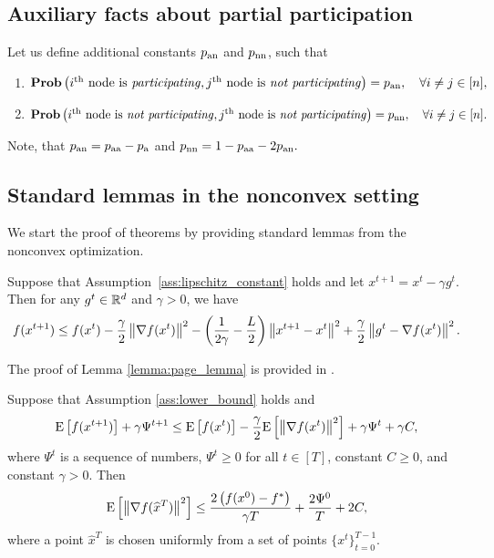 \documentclass{article}
\newcommand*{\probavailable}{\ensuremath{p_{\textnormal{a}}}}
\newcommand*{\probpairaa}{\ensuremath{p_{\textnormal{aa}}}}
\newcommand*{\probpairan}{\ensuremath{p_{\textnormal{an}}}}
\newcommand*{\probpairnn}{\ensuremath{p_{\textnormal{nn}}}}
\begin{document}
\subsection{Auxiliary facts about partial participation}
\label{sec:auxiliary_facts_partial_participation}
Let us define additional constants $\probpairan$ and $\probpairnn$, such that
\begin{enumerate}
  \item $\Prob\left(i^{\textnormal{th}} \textnormal{ node is \textit{participating}}, j^{\textnormal{th}} \textnormal{ node is \textit{not participating}}\right) = \probpairan, \quad \forall i \neq j \in [n],$
  \item $\Prob\left(i^{\textnormal{th}} \textnormal{ node is \textit{not participating}}, j^{\textnormal{th}} \textnormal{ node is \textit{not participating}}\right) = \probpairnn, \quad \forall i \neq j \in [n].$
\end{enumerate}
Note, that $\probpairan = \probpairaa - \probavailable$ and $\probpairnn = 1 - \probpairaa - 2 \probpairan.$

\subsection{Standard lemmas in the nonconvex setting}

We start the proof of theorems by providing standard lemmas from the nonconvex optimization.

\begin{lemma}
  \label{lemma:page_lemma}
  Suppose that Assumption~\ref{ass:lipschitz_constant} holds and let $x^{t+1} = x^{t} - \gamma g^{t}$. Then for any $g^{t} \in \mathbb{R}^d$ and $\gamma > 0$, we have
  \begin{eqnarray}
    \label{eq:page_lemma}
    f(x^{t + 1}) \leq f(x^t) - \frac{\gamma}{2}\left\| \nabla f(x^t) \right\|^2 - \left(\frac{1}{2\gamma} - \frac{L}{2}\right)
    \left\| x^{t+1} - x^t \right\|^2 + \frac{\gamma}{2}\left\| g^{t} - \nabla f(x^t) \right\|^2.
  \end{eqnarray}
\end{lemma}

The proof of Lemma \ref{lemma:page_lemma} is provided in \cite{PAGE}.

\begin{lemma}
  \label{lemma:good_recursion}
  Suppose that Assumption \ref{ass:lower_bound} holds and
  \begin{align*}
      {\rm E}\left[f(x^{t+1})\right] + \gamma \Psi^{t+1} \leq {\rm E}\left[f(x^t)\right] - \frac{\gamma}{2}{\rm E}\left[\left\| \nabla f(x^t) \right\|^2\right] + \gamma \Psi^{t} + \gamma C,
  \end{align*}
  where $\Psi^{t}$ is a sequence of numbers, $\Psi^{t} \geq 0$ for all $t \in [T]$, constant $C \geq 0$, and constant $\gamma > 0.$ Then 
  \begin{align}
      \label{eq:good_recursion}
      {\rm E}\left[\left\| \nabla f(\widehat{x}^T) \right\|^2\right] \leq \frac{2 \left(f(x^0) - f^*\right)}{\gamma T} + \frac{2\Psi^{0}}{T} + 2 C,
  \end{align}
  where a point $\widehat{x}^T$ is chosen uniformly from a set of points $\{x^t\}_{t=0}^{T-1}.$
\end{lemma}
\end{document}
